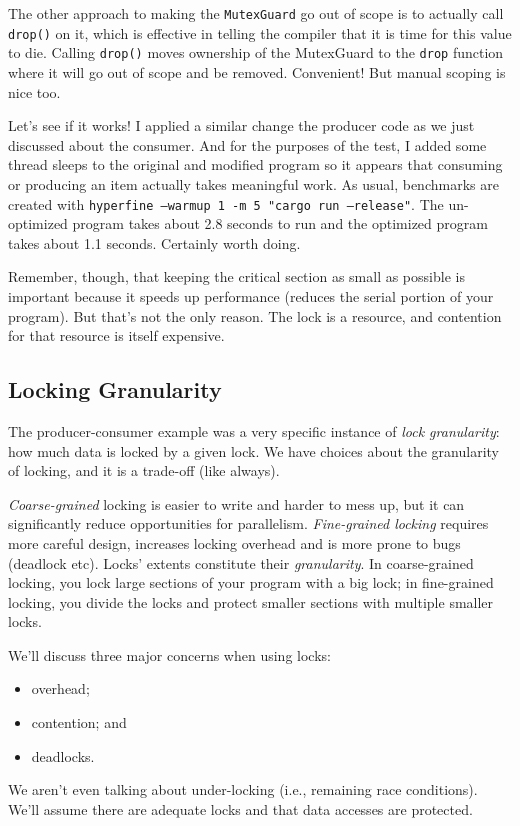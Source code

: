 \documentclass[a4paper]{report}
\begin{document}
The other approach to making the \texttt{MutexGuard} go out of scope is to actually call \texttt{drop()} on it, which is effective in telling the compiler that it is time for this value to die. Calling \texttt{drop()} moves ownership of the MutexGuard to the \texttt{drop} function where it will go out of scope and be removed. Convenient! But manual scoping is nice too.

Let's see if it works! I applied a similar change the producer code as we just discussed about the consumer. And for the purposes of the test, I added some thread sleeps to the original and modified program so it appears that consuming or producing an item actually takes meaningful work. As usual, benchmarks are created with \texttt{hyperfine --warmup 1 -m 5 "cargo run --release"}. The un-optimized program takes about 2.8 seconds to run and the optimized program takes about 1.1 seconds. Certainly worth doing.

Remember, though, that keeping the critical section as small as possible is important because it speeds up performance (reduces the serial portion of your program). But that's not the only reason. The lock is a resource, and contention for that resource is itself expensive.

\subsection*{Locking Granularity}

The producer-consumer example was a very specific instance of \textit{lock granularity}: how much data is locked by a given lock. We have choices about the granularity of locking, and it is a trade-off (like always).

\textit{Coarse-grained} locking is easier to write and harder to mess up, but it can significantly reduce opportunities for parallelism. \textit{
Fine-grained locking} requires more careful design,
increases locking overhead and is more prone to bugs (deadlock etc).
Locks' extents constitute their {\it granularity}. In coarse-grained locking, you
lock large sections of your program with a big lock; in fine-grained
locking, you divide the locks and protect smaller sections with multiple smaller locks.

We'll discuss three major concerns when using locks:
  \begin{itemize}
    \item overhead;
    \item contention; and
    \item deadlocks.
  \end{itemize}
We aren't even talking about under-locking (i.e., remaining race conditions). We'll assume there are adequate locks and that data accesses are protected.
\end{document}

